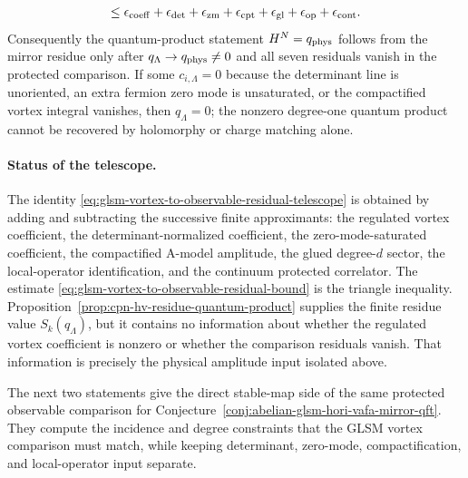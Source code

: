 \begin{remark}
\begin{equation}
  \le
  \epsilon_{\rm coeff}
  +\epsilon_{\rm det}
  +\epsilon_{\rm zm}
  +\epsilon_{\rm cpt}
  +\epsilon_{\rm gl}
  +\epsilon_{\rm op}
  +\epsilon_{\rm cont}.
  \label{eq:glsm-vortex-to-observable-residual-bound}
\end{equation}
Consequently the quantum-product statement \(H^N=q_{\rm phys}\) follows from
the mirror residue only after \(q_\Lambda\to q_{\rm phys}\neq0\) and all
seven residuals vanish in the protected comparison.  If some
\(c_{i,\Lambda}=0\) because the determinant line is unoriented, an extra
fermion zero mode is unsaturated, or the compactified vortex integral
vanishes, then \(q_\Lambda=0\); the nonzero degree-one quantum product cannot
be recovered by holomorphy or charge matching alone.
\end{remark}

\paragraph{Status of the telescope.}
The identity
\eqref{eq:glsm-vortex-to-observable-residual-telescope} is obtained by
adding and subtracting the successive finite approximants: the regulated
vortex coefficient, the determinant-normalized coefficient, the
zero-mode-saturated coefficient, the compactified A-model amplitude, the
glued degree-\(d\) sector, the local-operator identification, and the
continuum protected correlator.  The estimate
\eqref{eq:glsm-vortex-to-observable-residual-bound} is the triangle
inequality.  Proposition~\ref{prop:cpn-hv-residue-quantum-product} supplies
the finite residue value \(S_k(q_\Lambda)\), but it contains no information
about whether the regulated vortex coefficient is nonzero or whether the
comparison residuals vanish.  That information is precisely the physical
amplitude input isolated above.

The next two statements give the direct stable-map side of the same protected
observable comparison for
Conjecture~\ref{conj:abelian-glsm-hori-vafa-mirror-qft}.  They compute the
incidence and degree constraints that the GLSM vortex comparison must match,
while keeping determinant, zero-mode, compactification, and local-operator
input separate.

